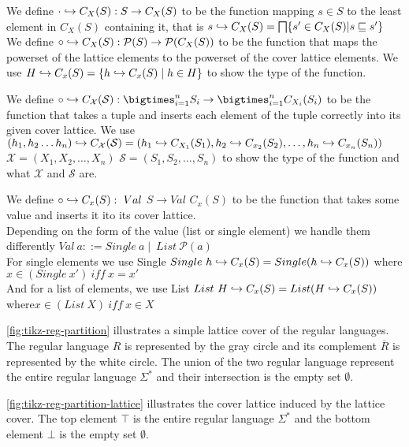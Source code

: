 \begin{definition}
    We define $\cdot \hookrightarrow C_X(S):S\rightarrow C_X(S)$ to be the function mapping $s\in S$ to the least element in $C_X(S)$ containing it, that is $s \into C_X(S)=\bigsqcap\{s'\in C_X(S)|s\sqsubseteq s'\}$
    \\

    We define $\circ \hookrightarrow C_X(S):\mathcal{P}(S)\rightarrow \mathcal{P}(C_X(S))$ to be the function that maps the powerset of the lattice elements to the powerset of the cover lattice elements.
    We use $H \hookrightarrow C_x (S) = \{h \hookrightarrow C_x (S) \mid h \in H\}$ to show the type of the function.
\end{definition}

\begin{definition}
    We define $\circ \into C_\mathcal{X}(\mathcal{S}): \bigtimes_{i = 1}^{n} S_i \rightarrow \bigtimes_{i = 1}^{n} C_{X_i}(S_i)$ to be the function that takes a tuple and inserts each element of the tuple correctly into its given cover lattice.
    We use $(h_1, h_2 \dots h_n)\hookrightarrow C_{\mathcal{X}}(\mathcal{S})=(h_1 \hookrightarrow C_{X_1}(S_1), h_2\hookrightarrow C_{x_2}(S_2), \dots, h_n \hookrightarrow C_{x_n}(S_n))$
    $\mathcal{X}=(X_1, X_2, \dots, X_n)$
    $\mathcal{S}=(S_1, S_2, \dots, S_n)$ to show the type of the function and what $\mathcal{X}$ and $\mathcal{S}$ are.
\end{definition}

\begin{definition}
    We define $\circ \into C_x(S): \ Val$ $S \rightarrow Val$ $C_x(S)$ to be the function that takes some value and inserts it ito its cover lattice. \\
    Depending on the form of the value (list or single element) we handle them differently $Val \ a ::= Single \ a \mid \ List \ \mathcal{P}(a)$ \\
    For single elements we use Single $Single \ h \hookrightarrow C_x(S) = Single(h\hookrightarrow C_x(S))$ where $x \in (Single \ x') \ iff \ x = x'$ \\
    And for a list of elements, we use List $List \ H \hookrightarrow C_x(S)=List(H\hookrightarrow C_x(S))$ where$x \in (List \ X) \ iff \ x \in X$ \\
\end{definition}


\begin{example}
    \autoref{fig:tikz-reg-partition} illustrates a simple lattice cover of the regular languages.
    The regular language $R$ is represented by the gray circle and its complement $\overline{R}$ is represented by the white circle.
    The union of the two regular language represent the entire regular language $\Sigma^*$ and their intersection is the empty set $\emptyset$.

    \autoref{fig:tikz-reg-partition-lattice} illustrates the cover lattice induced by the lattice cover.
    The top element $\top$ is the entire regular language $\Sigma^*$ and the bottom element $\bot$ is the empty set $\emptyset$.
\end{example}

